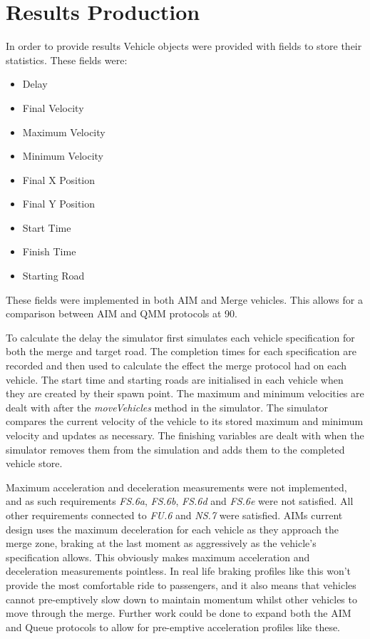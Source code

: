 \section{Results Production}
\label{sec:Results Production}
In order to provide results Vehicle objects were provided with fields to store their statistics. These fields were:

\begin{itemize}
\item Delay
\item Final Velocity
\item Maximum Velocity
\item Minimum Velocity
\item Final X Position
\item Final Y Position
\item Start Time
\item Finish Time
\item Starting Road
\end{itemize}

These fields were implemented in both AIM and Merge vehicles. This allows for a comparison between AIM and QMM protocols at 90\degree.

To calculate the delay the simulator first simulates each vehicle specification for both the merge and target road. The completion times for each specification are recorded and then used to calculate the effect the merge protocol had on each vehicle. The start time and starting roads are initialised in each vehicle when they are created by their spawn point. The maximum and minimum velocities are dealt with after the \emph{moveVehicles} method in the simulator. The simulator compares the current velocity of the vehicle to its stored maximum and minimum velocity and updates as necessary. The finishing variables are dealt with when the simulator removes them from the simulation and adds them to the completed vehicle store. 

Maximum acceleration and deceleration measurements were not implemented, and as such requirements \emph{FS.6a}, \emph{FS.6b}, \emph{FS.6d} and \emph{FS.6e} were not satisfied. All other requirements connected to \emph{FU.6} and \emph{NS.7} were satisfied. AIMs current design uses the maximum deceleration for each vehicle as they approach the merge zone, braking at the last moment as aggressively as the vehicle's specification allows. This obviously makes maximum acceleration and deceleration measurements pointless. In real life braking profiles like this won't provide the most comfortable ride to passengers, and it also means that vehicles cannot pre-emptively slow down to maintain momentum whilst other vehicles to move through the merge. Further work could be done to expand both the AIM and Queue protocols to allow for pre-emptive acceleration profiles like these.

